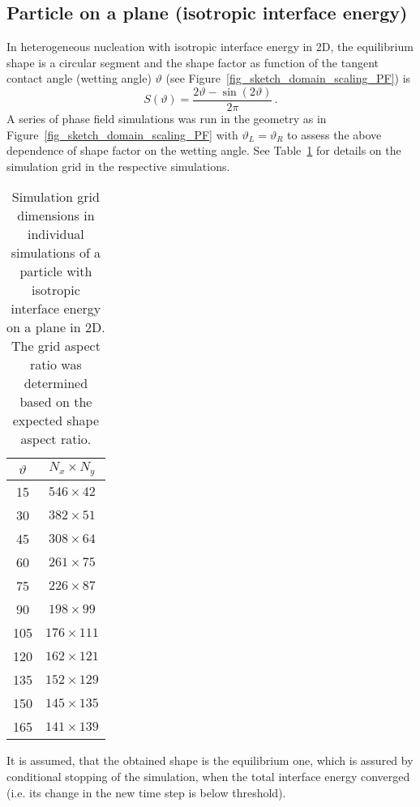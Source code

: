 \subsection{Particle on a plane (isotropic interface energy)}
In heterogeneous nucleation with isotropic interface energy in 2D, the equilibrium shape is a circular segment and the shape factor as function of the tangent contact angle (wetting angle) $\vartheta$ (see Figure~\ref{fig_sketch_domain_scaling_PF}) is
\begin{equation}
	S(\vartheta) = \frac{2\vartheta - \sin(2\vartheta)}{2\pi} \,.
\end{equation}
A series of phase field simulations was run in the geometry as in Figure~\ref{fig_sketch_domain_scaling_PF} with $\vartheta_L=\vartheta_R$ to assess the above dependence of shape factor on the wetting angle. See Table~\ref{tab_PF_NPA_param_particle_onplane} for details on the simulation grid in the respective simulations.
\begin{table}
	\centering
	\caption{Simulation grid dimensions in individual simulations of a particle with isotropic interface energy on a plane in 2D. The grid aspect ratio was determined based on the expected shape aspect ratio.}
	\label{tab_PF_NPA_param_particle_onplane}
	\begin{tabular}{c|c}
		$\vartheta$ & $N_x\times N_y$ \\ \hline
	 	15	&	$546\times 42$	\\
	 	30	&	$382\times 51$	\\
	 	45	&	$308\times 64$	\\
	 	60	&	$261\times 75$	\\
	 	75	&	$226\times 87$	\\
	 	90	&	$198\times 99$	\\
	 	105	&	$176\times 111$	\\
	 	120	&	$162\times 121$	\\
	 	135	&	$152\times 129$	\\
	 	150	&	$145\times 135$	\\
	 	165	&	$141\times 139$	
	\end{tabular}
\end{table}
It is assumed, that the obtained shape is the equilibrium one, which is assured by conditional stopping of the simulation, when the total interface energy converged (i.e. its change in the new time step is below threshold). 

